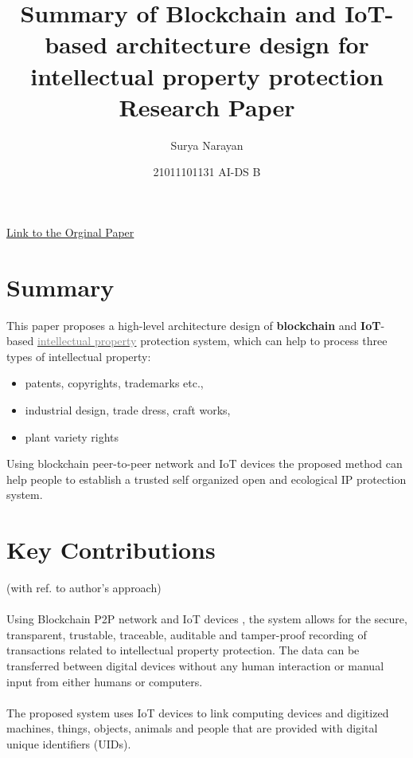 \documentclass[a4paper]{article}
\title{Summary of Blockchain and IoT-based
architecture design for
intellectual property protection Research Paper}
\date{21011101131 AI-DS B}
\author{Surya Narayan}
\begin{document}
\maketitle

\hfill\href{https://www.emerald.com/insight/content/doi/10.1108/IJCS-03-2020-0007/full/html}{Link to the Orginal Paper}
\section{Summary}
This paper proposes a high-level architecture design of \textbf{blockchain} and \textbf{IoT}-based \href{https://en.wikipedia.org/wiki/Intellectual_property}{\textcolor{gray}{intellectual property}} protection system, which can help to process three types of intellectual property: 
\begin{itemize}
  \item patents, copyrights, trademarks etc.,
  \item industrial design, trade dress, craft works,
  \item plant variety rights
\end{itemize}
Using blockchain peer-to-peer network and IoT devices the proposed method can help people to establish a trusted self organized open and ecological IP protection system.\\ 


\section{Key Contributions }\hfill(with ref. to author's approach)\\
\\
Using Blockchain P2P network and IoT devices , the system allows for the secure, transparent, trustable, traceable, auditable and tamper-proof recording of transactions related to intellectual property protection. The data can be transferred between digital devices without any human interaction or manual input from either humans or computers.\\
\\
The proposed system uses IoT devices to link computing devices and digitized machines, things, objects, animals and people that are provided with digital unique identifiers (UIDs).
\end{document}
